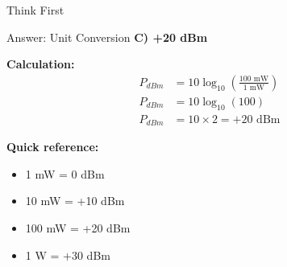 \documentclass[aspectratio=169,11pt]{beamer}
\begin{document}
\begin{frame}{Think First}
    \begin{center}
    \end{center}
\end{frame}

\begin{frame}{Answer: Unit Conversion}
    \textbf{C) +20 dBm}
    
    \vspace{0.5cm}
    \textbf{Calculation:}
    \begin{align*}
        P_{dBm} &= 10 \log_{10}\left(\frac{100 \text{ mW}}{1 \text{ mW}}\right) \\[0.3cm]
        P_{dBm} &= 10 \log_{10}(100) \\[0.3cm]
        P_{dBm} &= 10 \times 2 = +20 \text{ dBm}
    \end{align*}
    
    \vspace{0.3cm}
    \textbf{Quick reference:}
    \begin{itemize}
        \item 1 mW = 0 dBm
        \item 10 mW = +10 dBm
        \item 100 mW = +20 dBm
        \item 1 W = +30 dBm
    \end{itemize}
\end{frame}
\end{document}
